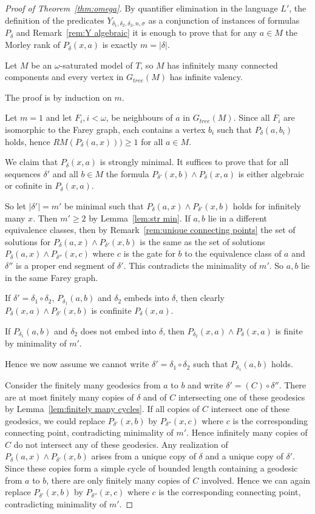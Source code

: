 \documentclass{amsart}
\renewcommand{\d}{\delta}
\begin{document}
 \begin{proof}[Proof of Theorem~\ref{thm:omega}]


By quantifier elimination in the language $L'$, the definition of the predicates $Y_{\delta_1, \delta_2, \delta_3, n, \sigma}$ as a conjunction of instances of formulas $P_\delta$ and Remark~\ref{rem:Y algebraic} it is enough to prove that for any $a\in M$ the Morley rank of     $P_\delta(x,a)$ is exactly $m=|\delta|$. 

    Let $M$ be an $\omega$-saturated model of $T$, so $M$ has infinitely many connected components and every vertex in $G_{tree}(M)$ has infinite valency.

The proof is by 
 induction on $m$.  

\bigskip

Let $m=1$ and  let $F_i, i<\omega$, be  neighbours of $a$ in $G_{tree}(M)$. Since all $F_i$ are isomorphic to the Farey graph, each contains a vertex $b_i$ such that $P_\d(a, b_i)$ holds, hence  $RM(P_\d(a, x)) ) \geq 1$ for all $a\in M$.

We claim that $P_\d(x,a)$ is strongly minimal. It suffices to prove that for all sequences $\d'$ and all $b\in M$ the formula $P_{\d'}(x,b)\wedge P_\d(x,a)$ is either algebraic or cofinite in $P_\d(x,a)$.

So let $|\d'|=m'$ be minimal such that $P_\d(a,x)\wedge P_{\d'}(x,b)$ holds for infinitely many $x$. Then $m'\geq 2$ by Lemma~\ref{lem:str min}.
If $a, b$ lie in a different equivalence classes, then by Remark~\ref{rem:unique connecting points} the set of solutions for $P_\d(a,x)\wedge P_{\d'}(x,b)$ is the same as the set of solutions $P_\d(a,x)\wedge P_{\d''}(x,c)$ where $c$ is the gate for $b$ to the equivalence class of $a$ and $\d''$ is a proper end segment of $\d'$. This contradicts the minimality of $m'$. So $a, b$ lie in the same Farey graph.

If $\d'=\d_1\circ\d_2$, $P_{\d_1}(a,b)$ and $\d_2$ embeds into $\d$, then clearly $P_\d(x,a)\wedge P_{\d'}(x,b)$ is confinite $P_\d(x,a)$. 

If $P_{\d_1}(a,b)$ and $\d_2$ does not embed into $\d$, then $P_{\d_2}(x,a)\wedge P_\d(x,a)$ is finite by minimality of $m'$. 

Hence we now assume we cannot write $\d'=\d_1\circ\d_2$ such that $P_{\d_1}(a,b)$ holds.

Consider the finitely many geodesics from $a$ to $b$ and write $\d'=(C)\circ\d''$. 
There are at most  finitely many copies of $\d$ and of $C$ intersecting one of these geodesics by Lemma~\ref{lem:finitely many cycles}. 
If all copies of $C$ intersect one of these geodesics, we could replace $P_{\d'}(x,b)$ by $P_{\d''}(x,c)$ where $c$ is the corresponding connecting point, contradicting minimality of $m'$.
Hence infinitely many copies of $C$ do not intersect any of these geodesics.
Any realization of $P_\d(a,x)\wedge P_{\d'}(x,b)$ arises from a unique copy of $\d$ and a unique copy of $\d'$. Since these copies form a simple cycle of bounded length containing a geodesic from $a$ to $b$, there are only finitely many copies of $C$ involved. Hence we can again replace $P_{\d'}(x,b)$ by $P_{\d''}(x,c)$ where $c$ is the corresponding connecting point, contradicting minimality of $m'$.


\end{proof}
\end{document}
